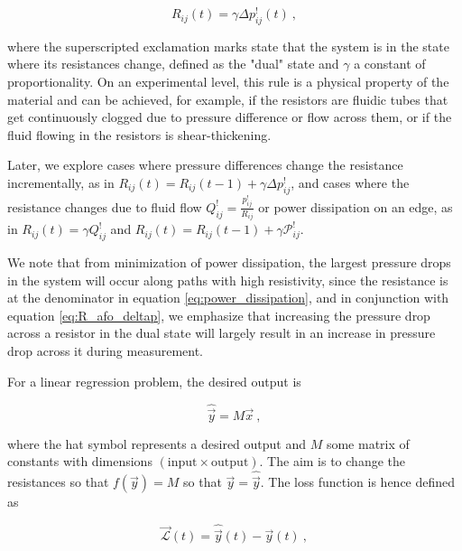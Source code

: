 \documentclass[%
 reprint,
 amsmath,amssymb,
 aps,
]{revtex4-2}
\begin{document}
    \begin{equation}\label{eq:R_afo_deltap}
        R_{ij}\left(t\right)=\gamma \Delta p^!_{ij}\left(t\right) \ ,
    \end{equation}

     where the superscripted exclamation marks state that the system is in the state where its resistances change, defined as the "dual" state and $\gamma$ a constant of proportionality. On an experimental level, this rule is a physical property of the material and can be achieved, for example, if the resistors are fluidic tubes that get continuously clogged due to pressure difference or flow across them, or if the fluid flowing in the resistors is shear-thickening. 
    
    Later, we explore cases where pressure differences change the resistance incrementally, as in $R_{ij}\left(t\right)=R_{ij}\left(t-1\right) + \gamma \Delta p^!_{ij}$, and cases where the resistance changes due to fluid flow $Q^!_{ij}=\frac{p^!_{ij}}{R_{ij}}$ or power dissipation on an edge, as in $R_{ij}\left(t\right) = \gamma Q^!_{ij}$ and $R_{ij}\left(t\right)=R_{ij}\left(t-1\right) + \gamma \mathcal{P}^!_{ij}$.

    We note that from minimization of power dissipation, the largest pressure drops in the system will occur along paths with high resistivity, since the resistance is at the denominator in equation \ref{eq:power_dissipation}, and in conjunction with equation \ref{eq:R_afo_deltap}, we emphasize that increasing the pressure drop across a resistor in the dual state will largely result in an increase in pressure drop across it during measurement.

    For a linear regression problem, the desired output is

    \begin{equation}\label{eq:task}
        \widehat{\vec{y}}=M\vec{x} \ ,
    \end{equation}

    where the hat symbol represents a desired output and $M$ some matrix of constants with dimensions $\left(\text{input}\times\text{output}\right)$. The aim is to change the resistances so that $f\left(\vec{y}\right)=M$ so that $\vec{y}=\widehat{\vec{y}}$. The loss function is hence defined as

    \begin{equation}\label{eq:loss}
        \vec{\mathcal{L}}\left(t\right)=\widehat{\vec{y}}\left(t\right)-\vec{y}\left(t\right) \ ,
    \end{equation}
    
\end{document}
